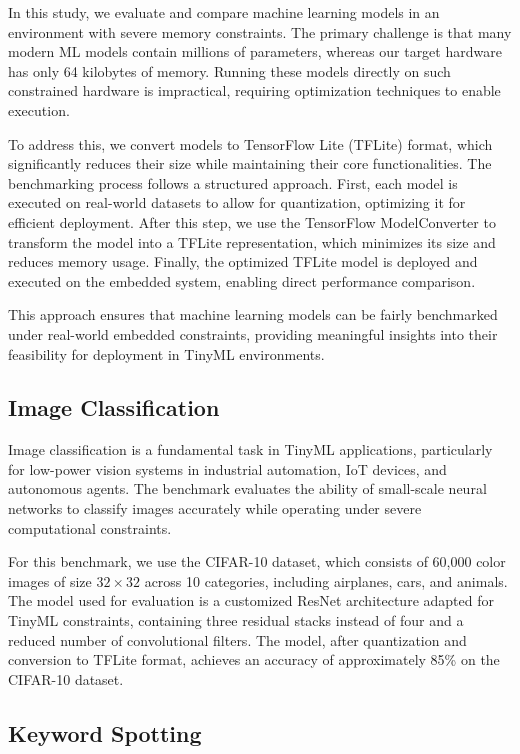 \documentclass[conference]{IEEEtran}
\begin{document}
In this study, we evaluate and compare machine learning models in an environment with severe memory constraints. The primary challenge is that many modern ML models contain millions of parameters, whereas our target hardware has only 64 kilobytes of memory. Running these models directly on such constrained hardware is impractical, requiring optimization techniques to enable execution.

To address this, we convert models to TensorFlow Lite (TFLite) format, which significantly reduces their size while maintaining their core functionalities. The benchmarking process follows a structured approach. First, each model is executed on real-world datasets to allow for quantization, optimizing it for efficient deployment. After this step, we use the TensorFlow ModelConverter to transform the model into a TFLite representation, which minimizes its size and reduces memory usage. Finally, the optimized TFLite model is deployed and executed on the embedded system, enabling direct performance comparison.

This approach ensures that machine learning models can be fairly benchmarked under real-world embedded constraints, providing meaningful insights into their feasibility for deployment in TinyML environments.

\subsection{Image Classification}

Image classification is a fundamental task in TinyML applications, particularly for low-power vision systems in industrial automation, IoT devices, and autonomous agents. The benchmark evaluates the ability of small-scale neural networks to classify images accurately while operating under severe computational constraints.

For this benchmark, we use the CIFAR-10 dataset, which consists of 60,000 color images of size $32\times32$ across 10 categories, including airplanes, cars, and animals. The model used for evaluation is a customized ResNet architecture adapted for TinyML constraints, containing three residual stacks instead of four and a reduced number of convolutional filters. The model, after quantization and conversion to TFLite format, achieves an accuracy of approximately 85\% on the CIFAR-10 dataset.

\subsection{Keyword Spotting}
\end{document}
